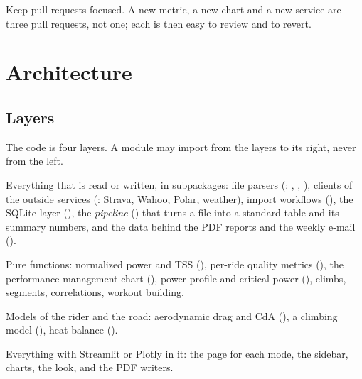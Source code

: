 Keep pull requests focused. A new metric, a new chart and a new service are three pull requests, not one; each is
then easy to review and to revert.

\chapter{Architecture}

\section{Layers}

The code is four layers. A module may import from the layers to its right, never from the left.

\begin{center}
\end{center}

\begin{description}[style=nextline,leftmargin=1.2em]
\item[\code{src/data}] Everything that is read or written, in subpackages: file parsers (: ,
  , ), clients of the outside services (: Strava, Wahoo, Polar, weather), import
  workflows (), the SQLite layer (), the \emph{pipeline} () that turns a
  file into a standard table and its summary numbers, and the data behind the PDF reports and the weekly e-mail ().
\item[\code{src/analysis}] Pure functions: normalized power and TSS (), per-ride quality metrics
  (), the performance management chart (), power profile and critical
  power (), climbs, segments, correlations, workout building.
\item[\code{src/physics}] Models of the rider and the road: aerodynamic drag and CdA (), a climbing
  model (), heat balance ().
\item[\code{src/viz}] Everything with Streamlit or Plotly in it: the page for each mode, the sidebar, charts, the
  look, and the PDF writers.
\end{description}


